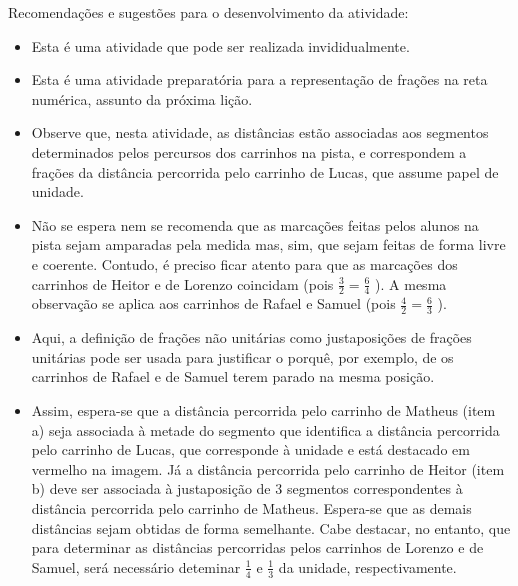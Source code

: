 \documentclass[oneside]{book}
\begin{document}
\begin{multicols}{2}
  Recomendações e sugestões para o desenvolvimento da atividade:
\begin{itemize} %
    \item       Esta é uma atividade que pode ser realizada invididualmente.
    \item       Esta é uma atividade preparatória para a representação de frações na reta numérica, assunto da próxima lição.
    \item       Observe que, nesta atividade, as distâncias estão associadas aos segmentos determinados pelos percursos dos carrinhos na pista, e correspondem a frações da distância percorrida pelo carrinho de Lucas, que assume papel de unidade.
    \item       Não se espera nem se recomenda que as marcações feitas pelos alunos na pista sejam amparadas pela medida mas, sim, que sejam feitas de forma livre e coerente. Contudo, é preciso ficar atento para que as marcações dos carrinhos de Heitor e de Lorenzo coincidam (pois       $\frac{3}{2} = \frac{6}{4}$      ). A mesma observação se aplica aos carrinhos de Rafael e Samuel (pois       $\frac{4}{2} = \frac{6}{3}$      ).
    \item       Aqui, a definição de frações não unitárias como justaposições de frações unitárias pode ser usada para justificar o porquê, por exemplo, de os carrinhos de Rafael e de Samuel terem parado na mesma posição.
    \item       Assim, espera-se que a distância percorrida pelo carrinho de Matheus (item a) seja associada à metade do segmento que identifica a distância percorrida pelo carrinho de Lucas, que corresponde à unidade e está destacado em vermelho na imagem. Já a distância percorrida pelo carrinho de Heitor (item b) deve ser associada à justaposição de       $3$       segmentos correspondentes à distância percorrida pelo carrinho de Matheus. Espera-se que as demais distâncias sejam obtidas de forma semelhante. Cabe destacar, no entanto, que para determinar as distâncias percorridas pelos carrinhos de Lorenzo e de Samuel, será necessário deteminar       $\frac{1}{4}$       e       $\frac{1}{3}$       da unidade, respectivamente.

\end{itemize}
\end{multicols}
\end{document}
